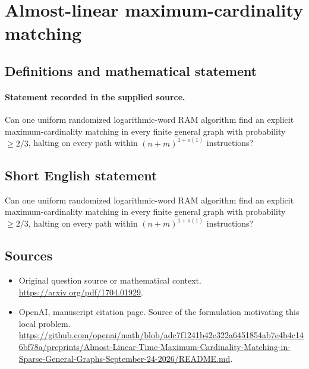 \documentclass[11pt]{article}
\begin{document}
\section*{Almost-linear maximum-cardinality matching}\label{30007480}
\subsection{Definitions and mathematical statement}
\paragraph{Statement recorded in the supplied source.}
Can one uniform randomized logarithmic-word RAM algorithm find an explicit maximum-cardinality matching in every finite general graph with probability $\geq 2/3$, halting on every path within $(n+m)^{1+o(1)}$ instructions?
\subsection{Short English statement}
Can one uniform randomized logarithmic-word RAM algorithm find an explicit maximum-cardinality matching in every finite general graph with probability $\geq 2/3$, halting on every path within $(n+m)^{1+o(1)}$ instructions?
\subsection{Sources}
\begin{itemize}
\item[S1] Original question source or mathematical context.
\url{https://arxiv.org/pdf/1704.01929}.
\item[S2] OpenAI, manuscript citation page. Source of the formulation motivating this local problem.
\url{https://github.com/openai/math/blob/adc7f1241b42e322a6451854ab7e4b4c146bf78a/preprints/Almost-Linear-Time-Maximum-Cardinality-Matching-in-Sparse-General-Graphs-September-24-2026/README.md}.
\end{itemize}
\end{document}
